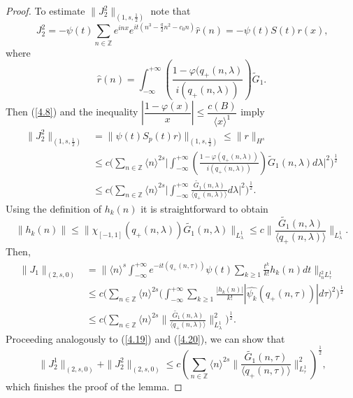 \documentclass[reqno]{amsart}
\numberwithin{equation}{section}
\begin{document}
\begin{proof}
To estimate
$\| J_{2}^{2}\| _{(1,s, \frac12 )}$
note that
\begin{equation*}
J_{2}^{2} =-\psi(t)\sum\limits_{n\in\mathbb{Z}}e^{inx}e^{it\left(
n^{3}-\frac{q}{2}n^{2}-c_{0}n\right)
}\widehat{r}(n)=-\psi(t)S(t)r(x)\text{,}
\end{equation*}
where
\begin{equation*}
\widehat{r}(n)=\int_{-\infty}^{+\infty}\left(
\frac{1-\varphi(q_{+}(n,\lambda)}{i(q_{+}(n,\lambda))}\right)  \widetilde{G}_{1}.
\end{equation*}
Then (\ref{4.8}) and the inequality $| \dfrac{1-\varphi(x)}{x}|
\leq\dfrac{c(B)}{\langle x\rangle^{1}}$ imply
\begin{equation}\label{4.20}
\begin{split}
\| J_{2}^{2}\| _{(1,s,\frac12)}
 &  =\| \psi(t)S_{p}(t)r)\| _{(1,s,\frac12)}\leq\| r\| _{H^{s}}\\
&  \leq c\Big(  \sum\limits_{n\in\mathbb{Z}}\langle n\rangle^{2s}\Big|
\int_{-\infty}^{+\infty}\left(  \frac{1-\varphi(q_{+}(n,\lambda))}{i(q_{+}(n,\lambda))}\right)
\widetilde{G}_{1}(n,\lambda)d\lambda\Big|^{2}\Big)^{\frac{1}{2}}\\
& \leq c\Big(  \sum\limits_{n\in\mathbb{Z}}\langle n\rangle^{2s}\Big|
\int_{-\infty}^{+\infty}\frac{\widetilde{G_{1}}(n,\lambda)}{\langle
q_{+}(n,\lambda)\rangle}d\lambda\Big| ^{2}\Big)^{\frac{1}{2}}.
\end{split}
\end{equation}
Using the definition of $h_{k}(n)$ it is straightforward to obtain
\[
\| h_{k}(n)\| \leq\| \mathcal{\chi}_{[-1,1]}(q_{+}(n,\lambda))\widetilde{G_{1}}(n,\lambda)\| _{L_{\lambda}^{1}}\leq c\Big\| \frac{\widetilde{G_{1}}(n,\lambda)}{\langle q_{+}(n,\lambda)\rangle}\Big\| _{L_{\lambda}^{1}}.
\]
Then,
\begin{equation}\label{4.21}
\begin{split}
\| J_{1}\| _{(2,s,0)}  &  =\| \langle
n\rangle ^{s}\int_{-\infty}^{+\infty}e^{-it\left(
q_{+}(n,\tau)\right)  }\psi
(t)\sum\limits_{k\geq1}\frac{t^{k}}{k!}h_{k}(n)dt\| _{l_{n}
^{2}L_{\tau}^{1}}\\
& \leq c\Big(\sum\limits_{n\in\mathbb{Z}}\langle
n\rangle^{2s}\Big(
\int_{-\infty}^{+\infty}\sum\limits_{k\geq1}\frac{|h_{k}(n)|}{k!}|
\widehat{\psi_{k}}(q_{+}(n,\tau))| d\tau\Big)^{2}\Big)^{\frac{1}{2}}\\
&\leq c\Big(\sum\limits_{n\in\mathbb{Z}}\langle n\rangle^{2s}
\|\frac{\widetilde{G_{1}}(n,\lambda)}{\langle q_{+}(n,\lambda)\rangle }
\| _{L_{\lambda}^{1}}^{2}\Big)^{\frac12}.
\end{split}
\end{equation}
Proceeding analogously to (\ref{4.19}) and (\ref{4.20}), we can show that
\[
\| J_{2}^{1}\| _{(2,s,0)}+\| J_{2}^{2}\| _{(2,s,0)}\leq c\left(
\sum\limits_{n\in\mathbb{Z}}\langle n\rangle ^{2s}\|
\frac{\widetilde{G_{1}}(n,\tau)}{\langle q_{+}(n,\tau)\rangle
}\| _{L_{\tau}^{1}}^{2}\right)  ^{\frac{1}{2}}\text{,}\]
which finishes the proof of the lemma.
\end{proof}
\end{document}
